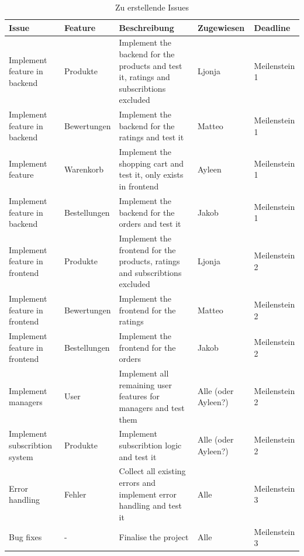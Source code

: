 \documentclass[12pt, a4paper]{scrreprt}
\begin{document}
		\begin{table}[h]
			\centering
			\caption{Zu erstellende Issues}
			\label{tab:example}
			\begin{tabular}{|p{2.5cm}|p{2.5cm}|p{5cm}|p{2.5cm}|p{2.5cm}|}
				\hline
				\textbf{Issue} & \textbf{Feature} & \textbf{Beschreibung} & \textbf{Zugewiesen} & \textbf{Deadline} \\ \hline
				
				\rowcolor{ms1}
				Implement feature in backend & Produkte & Implement the backend for the products and test it, ratings and subscribtions excluded & Ljonja & Meilenstein 1\\ \hline
				
				\rowcolor{ms1}
				Implement feature in backend& Bewertungen & Implement the backend for the ratings and test it & Matteo & Meilenstein 1\\ \hline
				
				\rowcolor{ms1}
				Implement feature & Warenkorb & Implement the  shopping cart and test it, only exists in frontend  & Ayleen & Meilenstein 1\\ \hline
				
				\rowcolor{ms1}
				Implement feature in backend& Bestellungen & Implement the backend for the orders and test it & Jakob & Meilenstein 1\\ \hline
				
				\rowcolor{ms2}
				Implement feature in frontend & Produkte & Implement the frontend for the products, ratings and subscribtions excluded & Ljonja & Meilenstein 2\\ \hline
				
				\rowcolor{ms2}
				Implement feature in frontend& Bewertungen & Implement the frontend for the ratings  & Matteo & Meilenstein 2\\ \hline
				
				\rowcolor{ms2}
				Implement feature in frontend& Bestellungen & Implement the frontend for the orders & Jakob & Meilenstein 2\\ \hline
				
				\rowcolor{ms2}
				Implement managers & User & Implement all remaining user features for managers and test them& Alle (oder Ayleen?) & Meilenstein 2\\ \hline
				
				\rowcolor{ms2}
				Implement subscribtion system & Produkte & Implement subscribtion logic and test it & Alle (oder Ayleen?)  & Meilenstein 2\\ \hline
				
				\rowcolor{ms3}
				Error handling & Fehler & Collect all existing errors and implement error handling and test it & Alle & Meilenstein 3\\ \hline
				
				\rowcolor{ms3}
				Bug fixes & - & Finalise the project & Alle & Meilenstein 3\\ \hline
			\end{tabular}
		\end{table}
		
\end{document}
